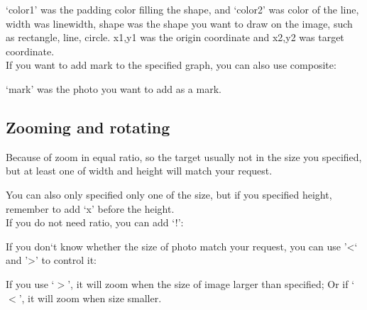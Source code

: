 \documentclass[12pt]{article}
\begin{document}
`color1' was the padding color filling the shape, and `color2' was color of the line, width was linewidth, shape was the shape you want to draw on the image, such as rectangle, line, circle. x1,y1 was the origin coordinate and x2,y2 was target coordinate.\\

If you want to add mark to the specified graph, you can also use composite:\vspace{5mm}

{\centering{}\par}\vspace{5mm}

`mark' was the photo you want to add as a mark.

\subsection{Zooming and rotating}
{\centering{}\par}\vspace{5mm}

Because of zoom in equal ratio, so the target usually not in the size you specified, but at least one of width and height will match your request.

You can also only specified only one of the size, but if you specified height, remember to add `x' before the height.\\

If you do not need ratio, you can add `!':\vspace{5mm}

{\centering{}\par} \vspace{5mm}

If you don`t know whether the size of photo match your request, you can use '\textless` and '\textgreater' to control it:\vspace{5mm}

{\centering{}\par}\vspace{5mm}

If you use `$>$', it will zoom when the size of image larger than specified; Or if `$<$', it will zoom when size smaller.
\end{document}
